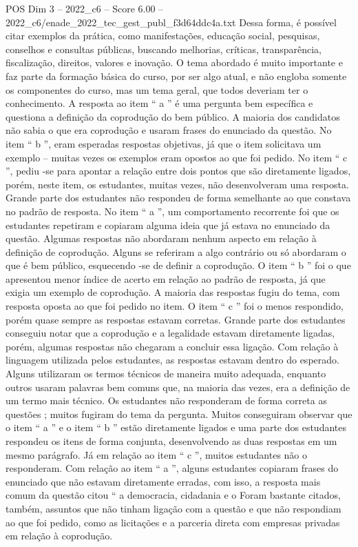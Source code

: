 \begin{textsample}{POS Dim 3 – 2022\_c6 – Score 6.00 – 2022\_c6/enade\_2022\_tec\_gest\_publ\_f3d64ddc4a.txt}
Dessa forma, é possível citar exemplos da prática, como manifestações, educação social, pesquisas, conselhos e consultas públicas, buscando melhorias, críticas, transparência, fiscalização, direitos, valores e inovação.
O tema abordado é muito importante e faz parte da formação básica do curso, por ser algo atual, e não engloba somente os componentes do curso, mas um tema geral, que todos deveriam ter o conhecimento.
A resposta ao item “ a ” é uma pergunta bem específica e questiona a definição da coprodução do bem público.
A maioria dos candidatos não sabia o que era coprodução e usaram frases do enunciado da questão.
No item “ b ”, eram esperadas respostas objetivas, já que o item solicitava um exemplo – muitas vezes os exemplos eram opostos ao que foi pedido.
No item “ c ”, pediu -se para apontar a relação entre dois pontos que são diretamente ligados, porém, neste item, os estudantes, muitas vezes, não desenvolveram uma resposta.
Grande parte dos estudantes não respondeu de forma semelhante ao que constava no padrão de resposta.
No item “ a ”, um comportamento recorrente foi que os estudantes repetiram e copiaram alguma ideia que já estava no enunciado da questão.
Algumas respostas não abordaram nenhum aspecto em relação à definição de coprodução.
Alguns se referiram a algo contrário ou só abordaram o que é bem público, esquecendo -se de definir a coprodução.
O item “ b ” foi o que apresentou menor índice de acerto em relação ao padrão de resposta, já que exigia um exemplo de coprodução.
A maioria das respostas fugiu do tema, com resposta oposta ao que foi pedido no item.
O item “ c ” foi o menos respondido, porém quase sempre as respostas estavam corretas.
Grande parte dos estudantes conseguiu notar que a coprodução e a legalidade estavam diretamente ligadas, porém, algumas respostas não chegaram a concluir essa ligação.
Com relação à linguagem utilizada pelos estudantes, as respostas estavam dentro do esperado.
Alguns utilizaram os termos técnicos de maneira muito adequada, enquanto outros usaram palavras bem comuns que, na maioria das vezes, era a definição de um termo mais técnico.
Os estudantes não responderam de forma correta as questões ; muitos fugiram do tema da pergunta.
Muitos conseguiram observar que o item “ a ” e o item “ b ” estão diretamente ligados e uma parte dos estudantes respondeu os itens de forma conjunta, desenvolvendo as duas respostas em um mesmo parágrafo.
Já em relação ao item “ c ”, muitos estudantes não o responderam.
Com relação ao item “ a ”, alguns estudantes copiaram frases do enunciado que não estavam diretamente erradas, com isso, a resposta mais comum da questão citou “ a democracia, cidadania e o Foram bastante citados, também, assuntos que não tinham ligação com a questão e que não respondiam ao que foi pedido, como as licitações e a parceria direta com empresas privadas em relação à coprodução.

\end{textsample}
